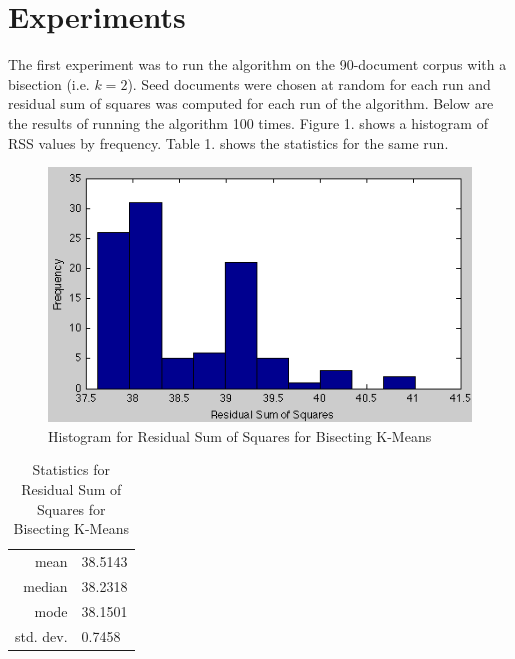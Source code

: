 \documentclass[12pt]{article}
\begin{document}

\section{Experiments} %
\label{sec:experiments}

The first experiment was to run the algorithm on the 90-document corpus with a bisection (i.e. $k = 2$). Seed documents were chosen at random for each run and residual sum of squares was computed for each run of the algorithm. Below are the results of running the algorithm 100 times. Figure 1. shows a histogram of RSS values by frequency. Table 1. shows the statistics for the same run.

\begin{figure}[h!]
  \centering
  \includegraphics[scale=0.6]{histogram.png}
  \caption{Histogram for Residual Sum of Squares for Bisecting K-Means}
\end{figure}

\begin{table}[h!]
  \centering
  \begin{tabular}{r|l}
    mean      &38.5143\\
    median    &38.2318\\
    mode      &38.1501\\
    std. dev. &0.7458
  \end{tabular}
  \caption{Statistics for Residual Sum of Squares for Bisecting K-Means}
\end{table}
\end{document}
